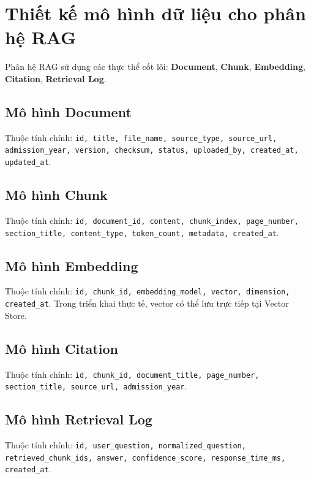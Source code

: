 ﻿\section{Thiết kế mô hình dữ liệu cho phân hệ RAG}

Phân hệ RAG sử dụng các thực thể cốt lõi: \textbf{Document}, \textbf{Chunk}, \textbf{Embedding}, \textbf{Citation}, \textbf{Retrieval Log}.

\subsection{Mô hình Document}

Thuộc tính chính: \texttt{id, title, file\_name, source\_type, source\_url, admission\_year, version, checksum, status, uploaded\_by, created\_at, updated\_at}.

\subsection{Mô hình Chunk}

Thuộc tính chính: \texttt{id, document\_id, content, chunk\_index, page\_number, section\_title, content\_type, token\_count, metadata, created\_at}.

\subsection{Mô hình Embedding}

Thuộc tính chính: \texttt{id, chunk\_id, embedding\_model, vector, dimension, created\_at}. Trong triển khai thực tế, vector có thể lưu trực tiếp tại Vector Store.

\subsection{Mô hình Citation}

Thuộc tính chính: \texttt{id, chunk\_id, document\_title, page\_number, section\_title, source\_url, admission\_year}.

\subsection{Mô hình Retrieval Log}

Thuộc tính chính: \texttt{id, user\_question, normalized\_question, retrieved\_chunk\_ids, answer, confidence\_score, response\_time\_ms, created\_at}.
